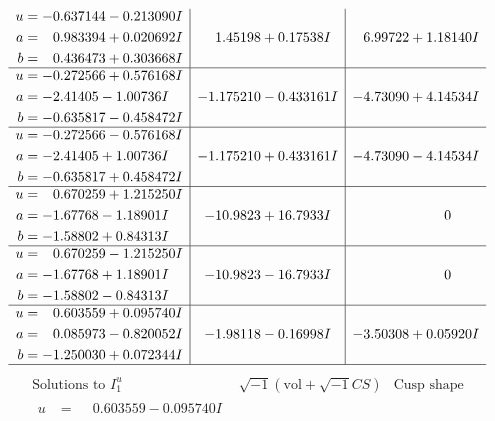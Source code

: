\documentclass[1p]{elsarticle_modified}
\theoremstyle{definition}
\newcommand{\I}{\sqrt{-1}}
\begin{document}
$$\begin{array}{c|c|c}
\begin{aligned}
u &= -0.637144 - 0.213090 I \\
a &= \phantom{-}0.983394 + 0.020692 I \\
b &= \phantom{-}0.436473 + 0.303668 I\end{aligned}
 & \phantom{-}1.45198 + 0.17538 I & \phantom{-}6.99722 + 1.18140 I \\ \hline\begin{aligned}
u &= -0.272566 + 0.576168 I \\
a &= -2.41405 - 1.00736 I \\
b &= -0.635817 - 0.458472 I\end{aligned}
 & -1.175210 - 0.433161 I & -4.73090 + 4.14534 I \\ \hline\begin{aligned}
u &= -0.272566 - 0.576168 I \\
a &= -2.41405 + 1.00736 I \\
b &= -0.635817 + 0.458472 I\end{aligned}
 & -1.175210 + 0.433161 I & -4.73090 - 4.14534 I \\ \hline\begin{aligned}
u &= \phantom{-}0.670259 + 1.215250 I \\
a &= -1.67768 - 1.18901 I \\
b &= -1.58802 + 0.84313 I\end{aligned}
 & -10.9823 + 16.7933 I & \phantom{-0.000000 } 0 \\ \hline\begin{aligned}
u &= \phantom{-}0.670259 - 1.215250 I \\
a &= -1.67768 + 1.18901 I \\
b &= -1.58802 - 0.84313 I\end{aligned}
 & -10.9823 - 16.7933 I & \phantom{-0.000000 } 0 \\ \hline\begin{aligned}
u &= \phantom{-}0.603559 + 0.095740 I \\
a &= \phantom{-}0.085973 - 0.820052 I \\
b &= -1.250030 + 0.072344 I\end{aligned}
 & -1.98118 - 0.16998 I & -3.50308 + 0.05920 I\\
 \hline 
 \end{array}$$\newpage$$\begin{array}{c|c|c}  
\text{Solutions to }I^u_{1}& \I (\text{vol} + \sqrt{-1}CS) & \text{Cusp shape}\\
 \hline 
\begin{aligned}
u &= \phantom{-}0.603559 - 0.095740 I \\

\end{aligned}
\end{array}$$
\end{document}
